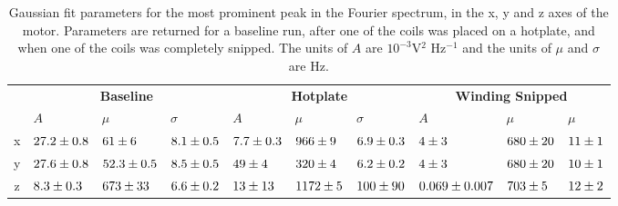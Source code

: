 \begin{table}[t]
\centering
\begin{tabular}{|c|p{1.2cm}p{1.2cm}p{1.2cm}|p{1.2cm}p{1.2cm}p{1.2cm}|p{1.2cm}p{1.2cm}p{1.2cm}|}
\hline
  & \multicolumn{3}{c|}{\textbf{Baseline}}                    & \multicolumn{3}{c|}{\textbf{Hotplate}}                & \multicolumn{3}{c|}{\textbf{Winding Snipped}}         \\ \cline{2-10} 
  & $A$            & $\mu$           & $\sigma$      & $A$           & $\mu$        & $\sigma$      & $A$               & $\mu$        & $\mu$      \\ \hline
x & $27.2 \newline \pm 0.8$ & $61 \newline \pm 6$      & $8.1 \newline \pm 0.5$ & $7.7 \newline \pm 0.3$ & $966 \newline \pm 9$  & $6.9 \newline \pm 0.3$ & $4 \newline \pm 3$         & $680 \newline \pm 20$ & $11 \newline \pm 1$ \\
y & $27.6 \newline \pm 0.8$ & $52.3 \newline \pm 0.5 $ & $8.5 \newline \pm 0.5$ & $49 \newline \pm 4$    & $320 \newline \pm 4$  & $6.2 \newline \pm 0.2$ & $4 \newline \pm 3$         & $680 \newline \pm 20$ & $10 \newline \pm 1$ \\
z & $8.3 \newline \pm 0.3$  & $673 \newline \pm 33$    & $6.6 \newline \pm 0.2$ & $13 \newline \pm 13$   & $1172 \newline \pm 5$ & $100 \newline \pm 90$  & $0.069 \newline \pm 0.007$ & $703 \newline \pm 5$  & $12 \newline \pm 2$ \\ \hline
\end{tabular}
\caption[Gaussian Fit Parameters for Overheating]{Gaussian fit parameters for the most prominent peak in the Fourier spectrum, in the x, y and z axes of the motor. Parameters are returned for a baseline run, after one of the coils was placed on a hotplate, and when one of the coils was completely snipped. The units of $A$ are $10^{-3}$V$^2$ Hz$^{-1}$ and the units of $\mu$ and $\sigma$ are Hz.}
\label{table:overheating_table}
\end{table}

